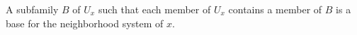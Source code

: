 A subfamily $B$ of $U_x$ such that each member of $U_x$ contains a member of $B$ is a base for the neighborhood system of $x$.
